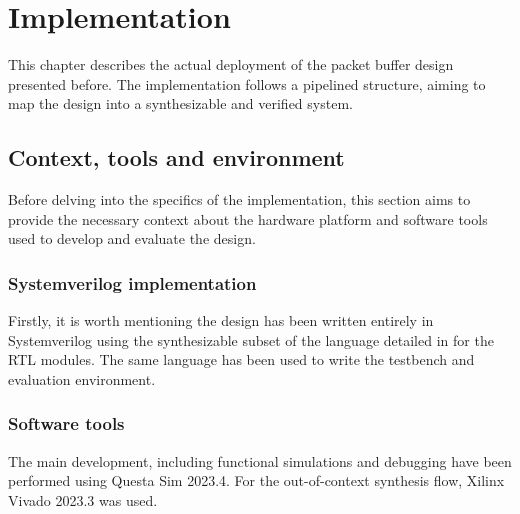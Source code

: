 \chapter{Implementation}\label{ch:implementation}

This chapter describes the actual deployment of the packet buffer design presented before. The implementation
follows a pipelined structure, aiming to map the design into a synthesizable and verified system.

\section{Context, tools and environment}
Before delving into the specifics of the implementation, this section aims to provide the necessary context 
about the hardware platform and software tools used to develop and evaluate the design. 

\subsection{Systemverilog implementation}
Firstly, it is worth mentioning the design has been written entirely in Systemverilog
using the synthesizable subset of the language detailed in \cite{sutherland2006synthesizable} for the RTL modules.
The same language has been used to write the testbench and evaluation environment.

\subsection{Software tools}
The main development, including functional simulations and debugging have been performed 
using Questa Sim 2023.4. For the out-of-context synthesis flow, Xilinx Vivado 2023.3 was used.

